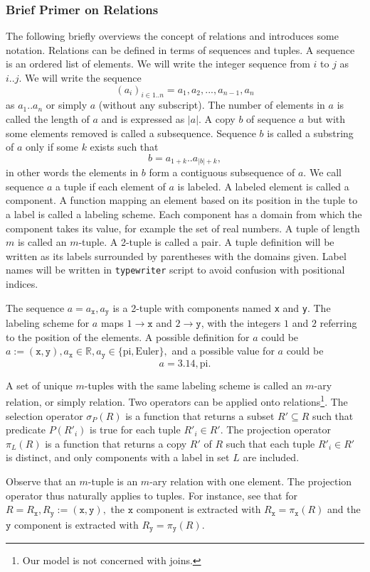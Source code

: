 \begin{mdframed}
\small
\subsubsection*{Brief Primer on Relations}
The following briefly overviews the concept of relations and introduces some
notation.  Relations can be defined in terms of sequences and tuples.  A
sequence is an ordered list of elements.  We will write the integer sequence
from $i$ to $j$ as $i..j$. We will write the sequence $$(a_i)_{i\in
1..n}=a_1,a_2,...,a_{n-1},a_n$$ as $a_1..a_n$ or simply $a$ (without any
subscript). The number of elements in $a$ is called the length of $a$ and is
expressed as $|a|$.  A copy $b$ of sequence $a$ but with some elements removed
is called a subsequence.  Sequence $b$ is called a substring of $a$ only if
some $k$ exists such that $$b=a_{1+k}..a_{|b|+k},$$ in other words the elements
in $b$ form a contiguous subsequence of $a$.  We call sequence $a$ a tuple if
each element of $a$ is labeled. A labeled element is called a component.  A
function mapping an element based on its position in the tuple to a label is
called a labeling scheme.  Each component has a domain from which the component
takes its value, for example the set of real numbers.  A tuple of length $m$ is
called an $m$-tuple. A 2-tuple is called a pair.  A tuple definition will be
written as its labels surrounded by parentheses with the domains given. Label
names will be written in \texttt{typewriter} script to avoid confusion with
positional indices.

\begin{example}
\label{ex:tuple}
The sequence $a=a_\texttt{x},a_\texttt{y}$
is a 2-tuple with components named \texttt{x} and \texttt{y}.
The labeling
scheme for $a$ maps $1\rightarrow \texttt{x}$ and $2\rightarrow \texttt{y}$, with the
integers $1$ and $2$ referring to the position of the elements. A possible definition for
$a$ could be $a:=(\texttt{x},\texttt{y}),
a_\texttt{x}\in\mathbb{R}, a_\texttt{y}\in\{\textrm{pi},\textrm{Euler}\},$ and
a possible value for $a$ could be $$a=3.14,\textrm{pi}.$$
\end{example}

A set of unique $m$-tuples with the same labeling scheme is called an $m$-ary
relation, or simply relation.  Two operators can be applied onto
relations\footnote{Our model is not concerned with joins.}.  The selection
operator $\sigma_P(R)$ is a function that returns a subset $R'\subseteq R$ such
that predicate $P(R'_i)$ is true for each tuple $R'_i\in R'$.  The projection
operator $\pi_L(R)$ is a function that returns a copy $R'$ of $R$ such that
each tuple $R'_i\in R'$ is distinct, and only components with a label in set
$L$ are included.

Observe that an $m$-tuple is an $m$-ary relation with one element.
The projection operator thus naturally applies to tuples. For instance, see that for
$R=R_\texttt{x},R_\texttt{y}:=(\texttt{x},\texttt{y}),$
the $\texttt{x}$ component is extracted with
$R_\texttt{x}=\pi_\texttt{x}(R)$
and the $\texttt{y}$ component is extracted with
$R_\texttt{y}=\pi_\texttt{y}(R)$.

\end{mdframed}

